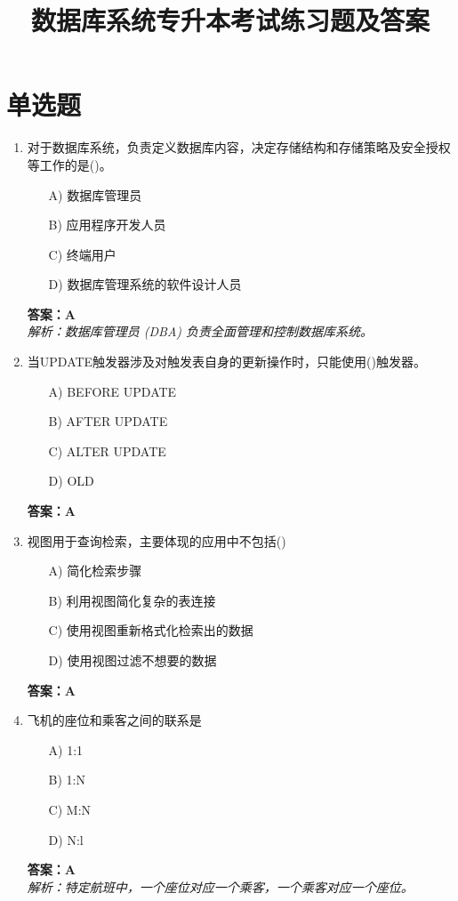 \documentclass[a4paper,12pt]{article}
\title{\textbf{数据库系统专升本考试练习题及答案}}
\author{}
\date{}
\begin{document}
\maketitle
\tableofcontents
\newpage

\section{单选题}

\begin{enumerate}[label=\arabic*.]

\item 对于数据库系统，负责定义数据库内容，决定存储结构和存储策略及安全授权等工作的是()。
\begin{itemize}
    \item[A)] 数据库管理员
    \item[B)] 应用程序开发人员
    \item[C)] 终端用户
    \item[D)] 数据库管理系统的软件设计人员
\end{itemize}
\textbf{答案：A} \\
\textit{解析：数据库管理员 (DBA) 负责全面管理和控制数据库系统。}

\item 当UPDATE触发器涉及对触发表自身的更新操作时，只能使用()触发器。
\begin{itemize}
    \item[A)] BEFORE UPDATE
    \item[B)] AFTER UPDATE
    \item[C)] ALTER UPDATE
    \item[D)] OLD
\end{itemize}
\textbf{答案：A}

\item 视图用于查询检索，主要体现的应用中不包括()
\begin{itemize}
    \item[A)] 简化检索步骤
    \item[B)] 利用视图简化复杂的表连接
    \item[C)] 使用视图重新格式化检索出的数据
    \item[D)] 使用视图过滤不想要的数据
\end{itemize}
\textbf{答案：A} 

\item 飞机的座位和乘客之间的联系是
\begin{itemize}
    \item[A)] 1:1
    \item[B)] 1:N
    \item[C)] M:N
    \item[D)] N:l
\end{itemize}
\textbf{答案：A} \\
\textit{解析：特定航班中，一个座位对应一个乘客，一个乘客对应一个座位。}


\end{enumerate}
\end{document}
